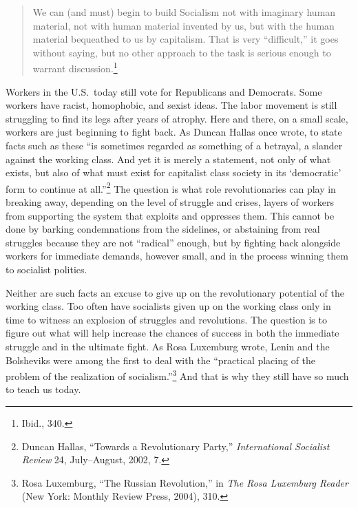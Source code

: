 \blockquote{We can (and must) begin to build Socialism not with imaginary human material, not with human material invented by us, but with the human material bequeathed to us by capitalism. That is very ``difficult,'' it goes without saying, but no other approach to the task is serious enough to warrant discussion.\footnote{Ibid., 340.}}

Workers in the U.S.\ today still vote for Republicans and Democrats. Some workers have racist, homophobic, and sexist ideas. The labor movement is still struggling to find its legs after years of atrophy. Here and there, on a small scale, workers are just beginning to fight back. As Duncan Hallas once wrote, to state facts such as these ``is sometimes regarded as something of a betrayal, a slander against the working class. And yet it is merely a statement, not only of what exists, but also of what must exist for capitalist class society in its `democratic' form to continue at all.''\footnote{Duncan Hallas, ``Towards a Revolutionary Party,'' \emph{International Socialist Review} 24, July--August, 2002, 7.} The question is what role revolutionaries can play in breaking away, depending on the level of struggle and crises, layers of workers from supporting the system that exploits and oppresses them. This cannot be done by barking condemnations from the sidelines, or abstaining from real struggles because they are not ``radical'' enough, but by fighting back alongside workers for immediate demands, however small, and in the process winning them to socialist politics.

Neither are such facts an excuse to give up on the revolutionary potential of the working class. Too often have socialists given up on the working class only in time to witness an explosion of struggles and revolutions. The question is to figure out what will help increase the chances of success in both the immediate struggle and in the ultimate fight. As Rosa Luxemburg wrote, Lenin and the Bolsheviks were among the first to deal with the ``practical placing of the problem of the realization of socialism.''\footnote{Rosa Luxemburg, ``The Russian Revolution,'' in \emph{The Rosa Luxemburg Reader} (New York: Monthly Review Press, 2004), 310.} And that is why they still have so much to teach us today.
